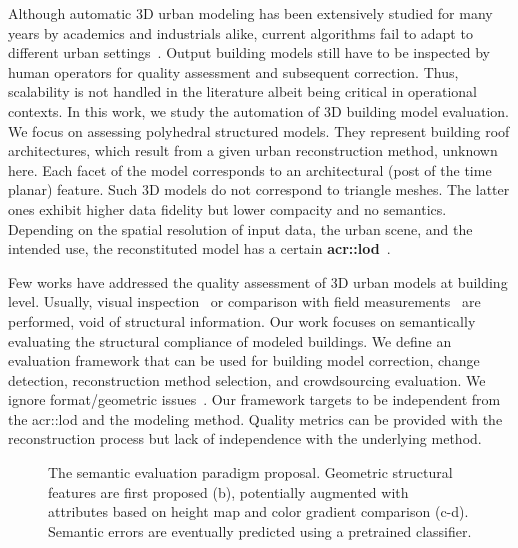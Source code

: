 \documentclass[conference]{IEEEtran}
\begin{document}
	Although automatic 3D urban modeling has been extensively studied for many years by academics and industrials alike, current algorithms fail to adapt to different urban settings~\cite{Musialski2012}. Output building models still have to be inspected by human operators for quality assessment and subsequent correction. Thus, scalability is not handled in the literature albeit being critical in operational contexts. In this work, we study the automation of 3D building model evaluation. We focus on assessing polyhedral structured models. They represent building roof architectures, which result from a given urban reconstruction method, unknown here. Each facet of the model corresponds to an architectural (post of the time planar) feature. Such 3D models do not correspond to triangle meshes. The latter ones exhibit higher data fidelity but lower compacity and no semantics. Depending on the spatial resolution of input data, the urban scene, and the intended use, the reconstituted model has a certain \textbf{\gls{acr::lod}}~\cite{kolbe2005citygml}.
    
    Few works have addressed the quality assessment of 3D urban models at building level. Usually, visual inspection~\cite{Durupt2006} or comparison with field measurements~\cite{Kaartinen2005} are performed, void of structural information. Our work focuses on semantically evaluating the structural compliance of modeled buildings. We define an evaluation framework that can be used for building model correction, change detection, reconstruction method selection, and crowdsourcing evaluation. We ignore format/geometric issues~\cite{ledoux2018val3dity}. Our framework targets to be independent from the \acrlong{acr::lod} and the modeling method. Quality metrics can be provided with the reconstruction process but lack of independence with the underlying method. 

	\begin{figure}
        \begin{center}
            
            \vspace{-.5cm}
            \caption{\label{fig::pipeline} The semantic evaluation paradigm proposal. Geometric structural features are first proposed (b), potentially augmented with attributes based on height map and color gradient comparison (c-d). Semantic errors are eventually predicted using a pretrained classifier.}
        \end{center}
    \end{figure}
\end{document}

